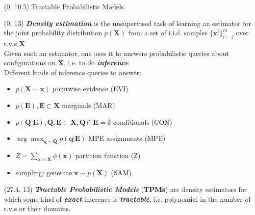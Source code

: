 \documentclass[final]{beamer}
\begin{document}
\begin{frame}{}
  
  \begin{textblock}{80}(0, 10.5)
    Tractable Probabilistic Models
  \end{textblock}
  
  
  \begin{textblock}{25.2}(0, 13)
    \small
    \emph{\textbf{Density estimation}} is the unsupervised task of
    learning an estimator for the joint probability distribution
    $p(\mathbf{X})$ from a set of i.i.d. samples $\{\mathbf
    x^i\}_{i=1}^m$ over r.v.s $\mathbf{X}$\\[20pt]
    
    Given such an estimator, one uses it to answers
    probabilistic queries about configurations on $\mathbf{X}$,
    i.e. to do \emph{\textbf{inference}}\\[20pt]
    
    Different kinds of inference queries to answer:
    \begin{itemize}
    \item $p(\mathbf{X} = \mathbf{x})$ pointwise evidence (EVI) 
    \item $p(\mathbf{E}), \mathbf{E}\subset\mathbf{X}$ marginals (MAR)
    \item $p(\mathbf{Q}|\mathbf{E}), \mathbf{Q},
      \mathbf{E}\subset\mathbf{X}, \mathbf{Q}\cap \mathbf{E}=\emptyset$
      conditionals (CON)
    \item $\arg\max_{\mathbf{q}\sim\mathbf{Q}}p(\mathbf{q}|\mathbf{E})$
      MPE assignments (MPE)
    \item $Z =\sum_{\mathbf{x}\sim \mathbf{X}}\phi(\mathbf{x})$
      partition function (Z)
      \item sampling: generate $\mathbf{x}\sim p(\mathbf{X})$ (SAM)
    \end{itemize}\vspace{20pt}
    

  \end{textblock}
  
  \begin{textblock}{25.2}(27.4, 13)
    \small
    \emph{\textbf{Tractable Probabilistic Models}}  (\textbf{TPMs})
    are density estimators for which some kind of  \textbf{\emph{exact}} inference is
    \textbf{\emph{tractable}}, i.e. polynomial in the number of r.v.s or their
    domains.\\[20pt]


\end{textblock}
\end{frame}
\end{document}
